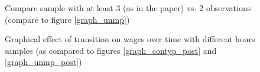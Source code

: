 \begin{figure}
    \caption{Compare sample with at least 3 (as in the paper) vs. 2 observations (compare to figure \ref{graph_unmp})}
    \label{graph_sensitivity_compare_unmp_sample_2_years}
\end{figure}

\begin{figure}
    \caption{Graphical effect of transition on wages over time with different hours samples (as compared to figures \ref{graph_contyp_post} and  \ref{graph_unmp_post})}
    \label{graph_post_hours}
\end{figure}

